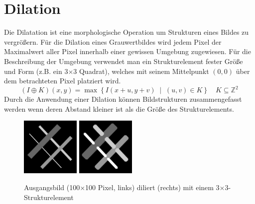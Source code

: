 \section{Dilation}
\writtenby{\dcauthornameewie}%
Die Dilatation ist eine morphologische Operation um Strukturen eines Bildes zu vergrößern.
Für die Dilation eines Grauwertbildes wird jedem Pixel der Maximalwert aller Pixel innerhalb einer gewissen Umgebung zugewiesen.
Für die Beschreibung der Umgebung verwendet man ein Strukturelement fester Größe und Form (z.B. ein 3$\times$3 Quadrat), welches mit seinem Mittelpunkt $(0,0)$ über dem betrachteten Pixel platziert wird.
  \[ (I\oplus K)(x,y)= \max \left\{ I(x+u,y+v) \;\middle|\; (u,v) \in K \right\} \quad K \subseteq \mathbb{Z}^2 \]
Durch die Anwendung einer Dilation können Bildstrukturen zusammengefasst werden wenn deren Abstand kleiner ist als die Größe des Strukturelements.

\begin{figure}[H]
  \label{fig:dilation}
  \centering
  \includegraphics[width=0.25\textwidth]{img/basics/dilation/before}
  \includegraphics[width=0.25\textwidth]{img/basics/dilation/after}
  \caption[Dilation]{Ausgangsbild (100$\times$100 Pixel, links) diliert (rechts) mit einem 3$\times$3-Strukturelement}
\end{figure}
